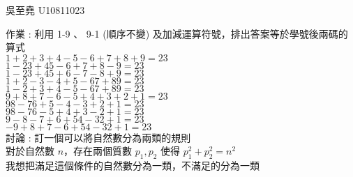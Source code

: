 \documentclass[12pt]{book}
\author{andersonwu2000}
\begin{document}
\begin{CJK}{UTF8}{bsmi}

\hfill 吳至堯 U10811023

作業 : 利用 1-9 、 9-1 (順序不變) 及加減運算符號，排出答案等於學號後兩碼的算式\\
$1+2+3+4-5-6+7+8+9=23$ \\
$1-23+45-6+7+8-9=23$ \\
$1-23+45+6-7-8+9=23$ \\
$1+2-3-4+5-67+89=23$ \\
$1-2+3+4-5-67+89=23$ \\
$9+8+7-6-5+4+3+2+1=23$ \\
$98-76+5-4-3+2+1=23$ \\
$98-76-5+4+3-2+1=23$ \\
$9-8-7+6+54-32+1=23$ \\
$-9+8+7-6+54-32+1=23$ \\

討論 : 訂一個可以將自然數分為兩類的規則 \\
對於自然數 $n$，存在兩個質數 $p_1, p_2$ 使得 $p_1^2+p_2^2=n^2$ \\
我想把滿足這個條件的自然數分為一類，不滿足的分為一類 \\


\end{CJK}
\end{document}
